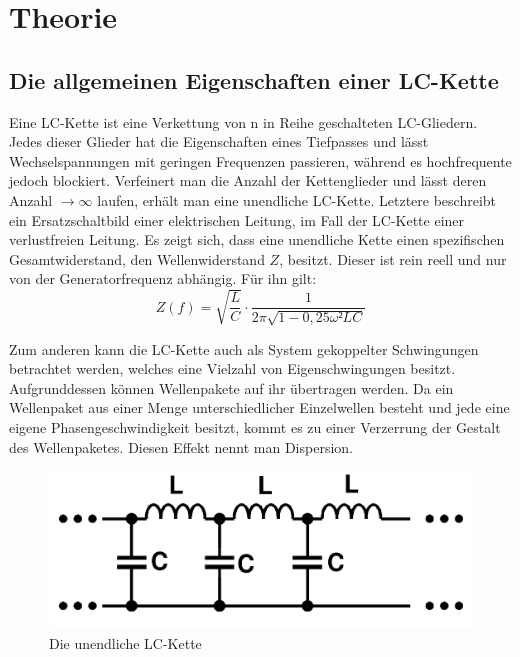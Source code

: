 
\section{Theorie}
\label{sec:Theorie}

\subsection{Die allgemeinen Eigenschaften einer LC-Kette}
Eine LC-Kette ist eine Verkettung von n in Reihe geschalteten LC-Gliedern.
 Jedes dieser Glieder hat die Eigenschaften eines Tiefpasses und lässt
  Wechselspannungen mit geringen Frequenzen passieren, während es hochfrequente jedoch
   blockiert. Verfeinert man die Anzahl der Kettenglieder und lässt
   deren Anzahl $\to \infty$ laufen, erhält man eine unendliche LC-Kette. Letztere
    beschreibt ein Ersatzschaltbild einer elektrischen Leitung, im Fall der
     LC-Kette einer verlustfreien Leitung. Es zeigt sich, dass eine unendliche
      Kette einen spezifischen Gesamtwiderstand, den Wellenwiderstand $Z$, besitzt.
      Dieser ist rein reell und nur von der Generatorfrequenz abhängig. Für ihn gilt:
      \begin{equation}
        Z(f) = \sqrt{\frac{L}{C}} \cdot \frac{1}{2\pi \sqrt{1-0,25\omega² LC}}
      \end{equation}

 Zum anderen kann die LC-Kette auch als System gekoppelter
    Schwingungen betrachtet werden, welches eine Vielzahl von Eigenschwingungen besitzt.
      Aufgrunddessen können Wellenpakete auf ihr übertragen werden.
     Da ein Wellenpaket aus einer Menge unterschiedlicher Einzelwellen besteht
      und jede eine eigene Phasengeschwindigkeit besitzt, kommt es zu einer Verzerrung
  der Gestalt des Wellenpaketes. Diesen Effekt nennt man Dispersion.


     \begin{figure}[H]
       \centering
       \includegraphics[width=\linewidth-300pt,height=\textheight-300pt,keepaspectratio]{content/Grafiken/LCKette.png}
       \caption{Die unendliche LC-Kette}
       \label{fig:LC-Kette}
     \end{figure}

